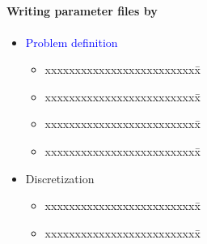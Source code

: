 \NEWSEC

\subsection{\ssParameters}

\begin{frame}[fragile,label=ss-parameters] 
\secframetitle{\ssParameters}
\framesubtitle{Writing parameter files by }
\vspace{-0.2in}
\begin{minipage}[t]{1.7in}
\begin{itemize}
\item 
\textcolor{blue}{Problem definition}
  \begin{itemize}
\pause
\item
\begin{tabbing}
xxxxxxxxxxxxxxxxxxxxxxxxxx\=\kill
  \textcolor{blue}{} \> 
\end{tabbing}
\item \begin{tabbing}
xxxxxxxxxxxxxxxxxxxxxxxxxx\=\kill
  \textcolor{blue}{} \> 
\end{tabbing}
\item \begin{tabbing}
xxxxxxxxxxxxxxxxxxxxxxxxxx\=\kill
  \textcolor{blue}{} \> 
\end{tabbing}
  \item \begin{tabbing}
xxxxxxxxxxxxxxxxxxxxxxxxxx\=\kill
 \textcolor{blue}{} \> 
\end{tabbing}
  \end{itemize}
\pause
\item \textcolor{green!50!black}{Discretization}
\pause
  \begin{itemize}
  \item \begin{tabbing}
xxxxxxxxxxxxxxxxxxxxxxxxxx\=\kill
 \textcolor{green!50!black}{} \> 
  \end{tabbing}  
  \item \begin{tabbing}
xxxxxxxxxxxxxxxxxxxxxxxxxx\=\kill
 \textcolor{green!50!black}{} \> 

\end{tabbing}
\end{itemize}
\end{itemize}
\end{minipage}
\end{frame}
